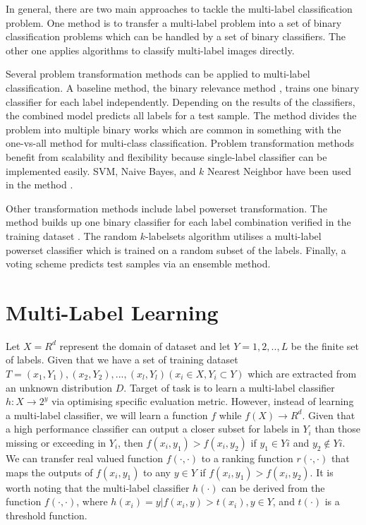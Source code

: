 In general, there are two main approaches to tackle the multi-label classification problem. One method is to transfer a multi-label problem into a set of binary classification problems which can be handled by a set of binary classifiers. The other one applies algorithms to classify multi-label images directly. 

Several problem transformation methods can be applied to multi-label classification. A baseline method, the binary relevance method \citep{read2011classifier}, trains one binary classifier for each label independently. Depending on the results of the classifiers, the combined model predicts all labels for a test sample. The method divides the problem into multiple binary works which are common in something with the one-vs-all method for multi-class classification. Problem transformation methods benefit from scalability and flexibility because single-label classifier can be implemented easily. SVM, Naive Bayes, and $k$ Nearest Neighbor have been used in the method \citep{read2011classifier}.

Other transformation methods include label powerset transformation. The method builds up one binary classifier for each label combination verified in the training dataset \citep{tsoumakas2006multi}. The random $k$-labelsets algorithm \citep{tsoumakas2007random} utilises a multi-label powerset classifier which is trained on a random subset of the labels. Finally, a voting scheme predicts test samples via an ensemble method.

\section{Multi-Label Learning}
Let $X = R^d$ represent the domain of dataset and let $Y = {1,2,..,L}$ be the finite set of labels. Given that we have a set of training dataset $T = {(x_{1},Y_{1}),(x_{2},Y_{2}),...,(x_{l},Y_{l})} (x_{i} \in X, Y_{i} \subset Y)$ which are extracted from an unknown distribution $D$. Target of task is to learn a multi-label classifier $h: X \to 2^y $ via optimising specific evaluation metric. However, instead of learning a multi-label classifier, we will learn a function $f$ while $f(X) \to R^d$. Given that a high performance classifier can output a closer subset for labels in $Y_{i}$ than those missing or exceeding in $Y_{i}$, then $f(x_{i}, y_{1}) > f(x_{i}, y_{2})$ if $y_{1} \in Y{i}$ and $y_{2} \notin Y{i}$. We can transfer real valued function $f(\cdot , \cdot)$ to a ranking function $r(\cdot , \cdot)$ that maps the outputs of $f(x_{i}, y_{1})$ to any $y \in Y$ if $f(x_{i}, y_{1}) > f(x_{i}, y_{2})$. It is worth noting that the multi-label classifier $h(\cdot)$ can be derived from the function $f(\cdot , \cdot)$, where $h(x_{i}) = {y|f(x_{i}, y) > t(x_{i}), y \in Y}$, and $t(\cdot)$ is a threshold function.

